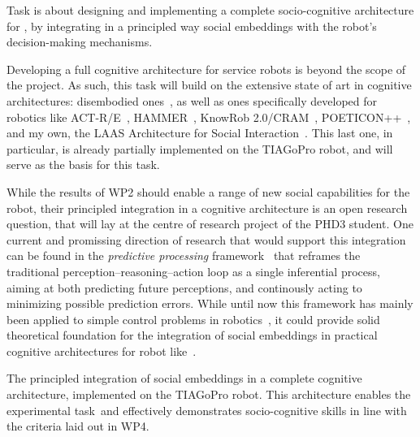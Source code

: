 Task \TCC is about designing and implementing a complete socio-cognitive
architecture for \project, by integrating in a principled way social embeddings
with the robot's decision-making mechanisms.

Developing a full cognitive architecture for service robots is beyond the scope
of the \project project. As such, this task will build on the extensive state
of art in cognitive architectures: disembodied
ones~\cite{chong2007integrated,vernon2007survey,kingdon2008review,duch2008cognitive,langley2009cognitive,taatgen2010past,thorisson2012cognitive},
as well as ones specifically developed for robotics like
ACT-R/E~\cite{trafton2013act}, HAMMER~\cite{demiris2006hierarchical}, KnowRob
2.0/CRAM~\cite{beetz2010cram, beetz2018knowrob},
POETICON++~\cite{antunes2016human}, and my own, the LAAS Architecture for
Social Interaction~\cite{lemaignan2017artificial}. This last one, in
particular, is already partially implemented on the TIAGoPro robot, and will
serve as the basis for this task.

While the results of WP2 should enable a range of new social capabilities for
the robot, their principled integration in a cognitive architecture is an open
research question, that will lay at the centre of research project of the PHD3
student. One current and promissing direction of research that would support
this integration can be found in the \emph{predictive processing}
framework~\cite{schillaci2016exploration} that reframes the traditional
perception--reasoning--action loop as a single inferential process, aiming at
both predicting future perceptions, and continously acting to minimizing
possible prediction errors. While until now this framework has mainly been
applied to simple control problems in robotics~\cite{ciria2021predictive}, it
could provide solid theoretical foundation for the integration of social embeddings in practical cognitive architectures for robot like~\cite{lemaignan2017artificial}.

\begin{framed}
 The principled integration of social
embeddings in a complete cognitive architecture, implemented on the
    TIAGoPro robot. This architecture enables the experimental task~\tDD and effectively demonstrates socio-cognitive skills in line with the criteria laid out in WP4.
\end{framed}



